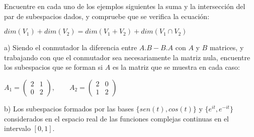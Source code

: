 \begin{exercise}
\item

Encuentre en cada uno de los ejemplos siguientes la suma y la intersección del par de subespacios dados, y compruebe
que se verifica la ecuación:

\bigskip

    $dim(V_1)+dim(V_2) = dim(V_1+V_2) + dim(V_1 \cap V_2)$
    
\bigskip
		
		
a) Siendo el conmutador la diferencia entre $A.B - B.A$ con $A$ y $B$ matrices, y trabajando con que el conmutador sea necesariamente la matriz nula, encuentre los subespacios que se forman si $A$ es la matriz que se muestra en cada caso:

\bigskip

$A_1=\left(\begin{array}{cc} 2 & 1  \\ 0 & 2 
\end{array}
 \right), \qquad    A_2=\left(\begin{array}{cc} 2 & 0 \\ 1 & 2 
\end{array}
 \right)$\\
 
 \bigskip
 
b) Los subespacios formados por las bases $\{sen(t),cos(t)\}$ y $\{e^{it},e^{-it}\}$ considerados en el espacio real de las funciones complejas continuas en el intervalo $[0,1]$.
\end{exercise}

